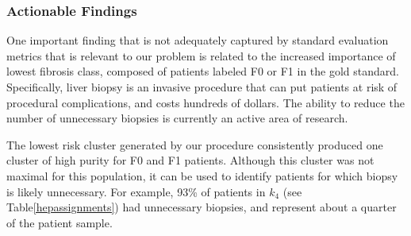 \subsubsection{Actionable Findings}
One important finding that is not adequately captured by standard evaluation metrics that is relevant to our problem is related to the increased importance of lowest fibrosis class, composed of patients labeled F0 or F1 in the gold standard.  Specifically, liver biopsy is an invasive procedure that can put patients at risk of procedural complications, and costs hundreds of dollars.  The ability to reduce the number of unnecessary biopsies is currently an active area of research.

The lowest risk cluster generated by our procedure consistently produced one cluster of high purity for F0 and F1 patients.  Although this cluster was not maximal for this population, it can be used to identify patients for which biopsy is likely unnecessary.  For example, 93\% of patients in $k_4$  (see Table\ref{hepassignments}) had unnecessary biopsies, and represent about a quarter of the patient sample.





